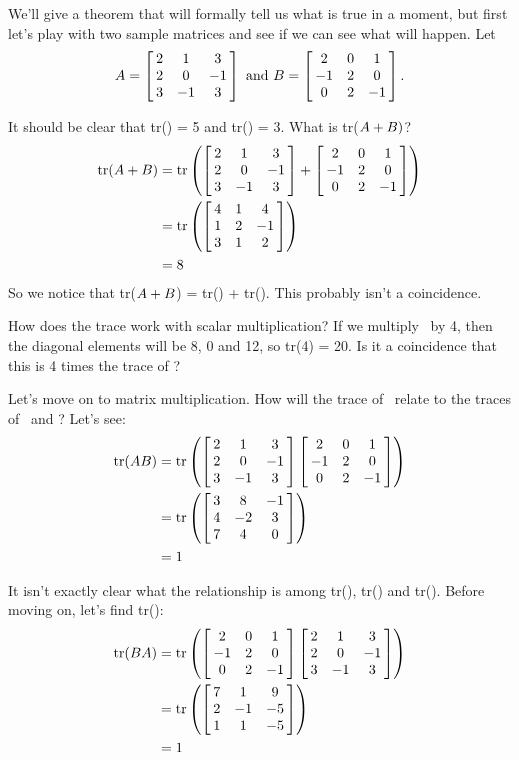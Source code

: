 We'll give a theorem that will formally tell us what is true in a moment, but first let's play with two sample matrices and see if we can see what will happen. Let $$\tta = \bmx{ccc} 2&1&3\\2&0&-1\\3&-1&3\emx \ \text{and} \ \ttb = \bmx{ccc}2&0&1\\-1&2&0\\0&2&-1\emx.$$

It should be clear that tr(\tta) = 5 and tr(\ttb) = 3. What is  tr($\tta+\ttb)$?
\begin{align*}
	\text{tr}(\tta+\ttb) &=	\text{tr}\left(\bmx{ccc} 2&1&3\\2&0&-1\\3&-1&3\emx + \bmx{ccc}2&0&1\\-1&2&0\\0&2&-1\emx\right) \\
				&=	\text{tr}\left(\bmx{ccc} 4&1&4\\1&2&-1\\3&1&2\emx\right)\\
				&= 8
\end{align*}
So we notice that tr($\tta+\ttb$) = tr(\tta) + tr(\ttb). This probably isn't a coincidence.

How does the trace work with scalar multiplication? If we multiply \tta\ by 4, then the diagonal elements will be 8, 0 and 12, so tr(4\tta) = 20. Is it a coincidence that this is 4 times the trace of \tta?

Let's move on to matrix multiplication. How will the trace of \tta\ttb\ relate to the traces of \tta\ and \ttb? Let's see:
\begin{align*}
	\text{tr}(\tta\ttb) &=\text{tr}\left(\bmx{ccc} 2&1&3\\2&0&-1\\3&-1&3\emx \bmx{ccc}2&0&1\\-1&2&0\\0&2&-1\emx\right) \\
					&=	\text{tr}\left(\bmx{ccc} 3&8&-1\\4&-2&3\\7&4&0\emx\right)\\
					&=	1
	\end{align*}

It isn't exactly clear what the relationship is among tr(\tta), tr(\ttb) and tr(\tta\ttb). Before moving on, let's find tr(\ttb\tta):
\begin{align*}
 \text{tr}(\ttb\tta) &= \text{tr}\left(\bmx{ccc}2&0&1\\-1&2&0\\0&2&-1\emx\bmx{ccc} 2&1&3\\2&0&-1\\3&-1&3\emx\right) \\
 										 &= \text{tr} \left(\bmx{ccc} 7 & 1 & 9 \\2 & -1 & -5\\ 1 & 1 & -5 \emx\right)\\
 										 &= 1
\end{align*}

